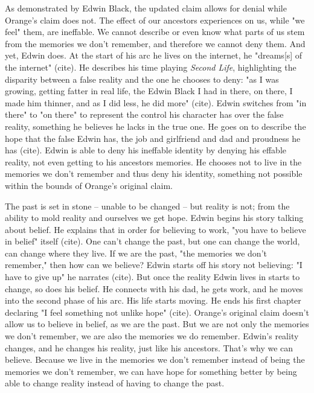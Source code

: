 \documentclass[letterpaper]{article}
\begin{document}
\begin{enumerate}
As demonstrated by Edwin Black, the updated claim allows for denial
while Orange's claim does not. The effect of our ancestors experiences
on us, while "we feel" them, are ineffable. We cannot describe or even
know what parts of us stem from the memories we don't remember, and
therefore we cannot deny them. And yet, Edwin does. At the start of his
arc he lives on the internet, he "dreams[s] of the internet" (cite). He
describes his time playing \emph{Second Life}, highlighting the disparity
between a false reality and the one he chooses to deny: "as I was
growing, getting fatter in real life, the Edwin Black I had in there, on
there, I made him thinner, and as I did less, he did more" (cite). Edwin
switches from "in there" to "on there" to represent the control his
character has over the false reality, something he believes he lacks in
the true one. He goes on to describe the hope that the false Edwin has,
the job and girlfriend and dad and proudness he has (cite). Edwin is
able to deny his ineffable identity by denying his effable reality, not
even getting to his ancestors memories. He chooses not to live in the
memories we don't remember and thus deny his identity, something not
possible within the bounds of Orange's original claim.

The past is set in stone -- unable to be changed -- but reality is not;
from the ability to mold reality and ourselves we get hope. Edwin begins
his story talking about belief. He explains that in order for believing
to work, "you have to believe in belief" itself (cite). One can't change
the past, but one can change the world, can change where they live. If
we are the past, "the memories we don't remember," then how can we
believe? Edwin starts off his story not believing: "I have to give up"
he narrates (cite). But once the reality Edwin lives in starts to
change, so does his belief. He connects with his dad, he gets work, and
he moves into the second phase of his arc. His life starts moving. He
ends his first chapter declaring "I feel something not unlike hope"
(cite). Orange's original claim doesn't allow us to believe in belief,
as we are the past. But we are not only the memories we don't remember,
we are also the memories we do remember. Edwin's reality changes, and he
changes his reality, just like his ancestors. That's why we can believe.
Because we live in the memories we don't remember instead of being the
memories we don't remember, we can have hope for something better by
being able to change reality instead of having to change the past.


\end{enumerate}
\end{document}

